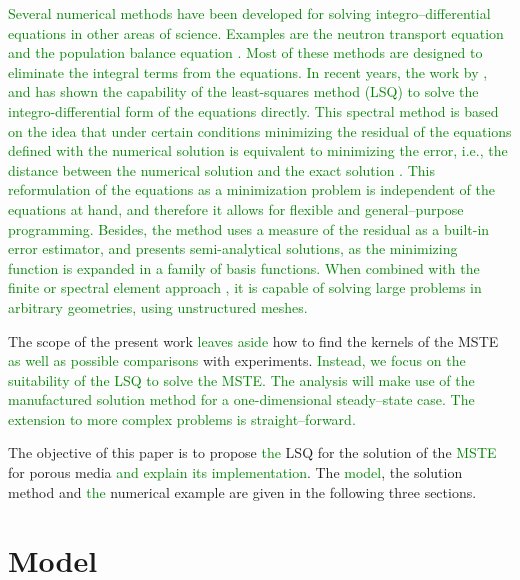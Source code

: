 \documentclass{CFD2011}
\newcommand{\newf}[1]{\textcolor{green}{#1}}
\newcommand{\nof}[1]{\textcolor{cyan}{}}
\begin{document}
\newf{Several numerical methods have been developed for solving integro--differential equations in other areas of science. Examples are the neutron transport equation \cite{Duderstad1976} and the population balance equation \cite{Ramkrishna2000}. Most of these methods are designed to eliminate the integral terms from the equations.}
\newf{In recent years, the work by \cite{Dorao05a}, \cite{Patruno2010} and \cite{Sporleder2011} has shown the capability of the least-squares method (LSQ) to solve the integro-differential form of the equations directly. This spectral method is based on the idea that under certain conditions minimizing the residual of the equations defined with the numerical solution is equivalent to minimizing the error, i.e., the distance between the numerical solution and the exact solution \cite{Jiang1998}. This reformulation of the equations as a minimization problem is independent of the equations at hand, and therefore it allows for flexible and general--purpose programming. Besides, the method uses a measure of the residual as a built-in error estimator, and presents semi-analytical solutions, as the minimizing function is expanded in a family of basis functions. When combined with the finite or spectral element approach \cite{Gerritsma2010}, it is capable of solving large problems in arbitrary geometries, using unstructured meshes.}

The scope of the present work \nof{does not allow us to address}\newf{leaves aside} how to find \nof{any of }the kernels of the MSTE \nof{nor any comparison}\newf{as well as possible comparisons} with experiments. \nof{We are interested in the study of the suitability of the LSQ method for the solution of the MSTE for porous media, and this will be achieved by the manufactured solution method. We will only focus here in the steady state case, in one dimension only.}\newf{Instead, we focus on the suitability of the LSQ to solve the MSTE. The analysis will make use of the manufactured solution method for a one-dimensional steady--state case. The extension to more complex problems is straight--forward.}

The objective of this paper is to propose \nof{and explain how to use} \newf{the }LSQ for the solution of the \nof{multi-scale transport equation}\newf{MSTE} for porous media \newf{and explain its implementation}. The \nof{multi-scale transport}\newf{model}, the solution method and \nof{a}\newf{the} numerical example are given in the following three sections.

\section{Model}
\end{document}
